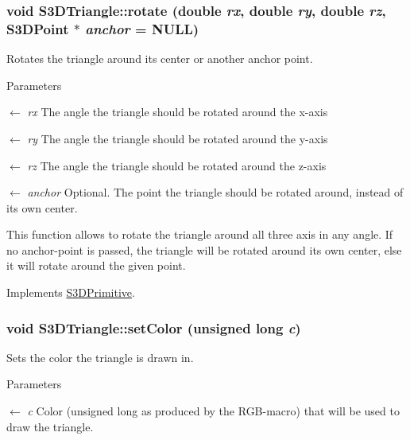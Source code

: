 \hypertarget{class_s3_d_triangle_a3e739f6c9c176e58cb734db7328cf039}{
\subsubsection[{rotate}]{\setlength{\rightskip}{0pt plus 5cm}void S3DTriangle::rotate (double {\em rx}, \/  double {\em ry}, \/  double {\em rz}, \/  {\bf S3DPoint} $\ast$ {\em anchor} = {\ttfamily NULL})}}
\label{class_s3_d_triangle_a3e739f6c9c176e58cb734db7328cf039}


Rotates the triangle around its center or another anchor point. 


\begin{DoxyParams}{Parameters}
\item[\mbox{$\leftarrow$} {\em rx}]The angle the triangle should be rotated around the x-\/axis \item[\mbox{$\leftarrow$} {\em ry}]The angle the triangle should be rotated around the y-\/axis \item[\mbox{$\leftarrow$} {\em rz}]The angle the triangle should be rotated around the z-\/axis \item[\mbox{$\leftarrow$} {\em anchor}]Optional. The point the triangle should be rotated around, instead of its own center.\end{DoxyParams}
This function allows to rotate the triangle around all three axis in any angle. If no anchor-\/point is passed, the triangle will be rotated around its own center, else it will rotate around the given point. 

Implements \hyperlink{class_s3_d_primitive_a23eb36b6bd48643e8f7be4b950592d9e}{S3DPrimitive}.

\hypertarget{class_s3_d_triangle_a2c60503c3bae194ec8247a0e2467c915}{
\subsubsection[{setColor}]{\setlength{\rightskip}{0pt plus 5cm}void S3DTriangle::setColor (unsigned long {\em c})}}
\label{class_s3_d_triangle_a2c60503c3bae194ec8247a0e2467c915}


Sets the color the triangle is drawn in. 


\begin{DoxyParams}{Parameters}
\item[\mbox{$\leftarrow$} {\em c}]Color (unsigned long as produced by the RGB-\/macro) that will be used to draw the triangle. \end{DoxyParams}



